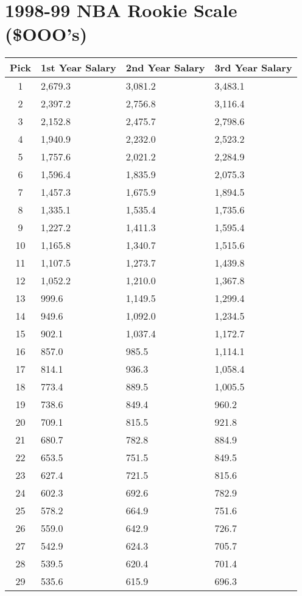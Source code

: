 \documentclass[
]{book}
\begin{document}
\newpage

\hypertarget{nba-rookie-scale-ooos}{%
\section{1998-99 NBA Rookie Scale (\$OOO's)}\label{nba-rookie-scale-ooos}}

\begin{longtable}[]{@{}clll@{}}
\toprule()
Pick & 1st Year Salary & 2nd Year Salary & 3rd Year Salary \\
\midrule()
\endhead
1 & 2,679.3 & 3,081.2 & 3,483.1 \\
2 & 2,397.2 & 2,756.8 & 3,116.4 \\
3 & 2,152.8 & 2,475.7 & 2,798.6 \\
4 & 1,940.9 & 2,232.0 & 2,523.2 \\
5 & 1,757.6 & 2,021.2 & 2,284.9 \\
6 & 1,596.4 & 1,835.9 & 2,075.3 \\
7 & 1,457.3 & 1,675.9 & 1,894.5 \\
8 & 1,335.1 & 1,535.4 & 1,735.6 \\
9 & 1,227.2 & 1,411.3 & 1,595.4 \\
10 & 1,165.8 & 1,340.7 & 1,515.6 \\
11 & 1,107.5 & 1,273.7 & 1,439.8 \\
12 & 1,052.2 & 1,210.0 & 1,367.8 \\
13 & 999.6 & 1,149.5 & 1,299.4 \\
14 & 949.6 & 1,092.0 & 1,234.5 \\
15 & 902.1 & 1,037.4 & 1,172.7 \\
16 & 857.0 & 985.5 & 1,114.1 \\
17 & 814.1 & 936.3 & 1,058.4 \\
18 & 773.4 & 889.5 & 1,005.5 \\
19 & 738.6 & 849.4 & 960.2 \\
20 & 709.1 & 815.5 & 921.8 \\
21 & 680.7 & 782.8 & 884.9 \\
22 & 653.5 & 751.5 & 849.5 \\
23 & 627.4 & 721.5 & 815.6 \\
24 & 602.3 & 692.6 & 782.9 \\
25 & 578.2 & 664.9 & 751.6 \\
26 & 559.0 & 642.9 & 726.7 \\
27 & 542.9 & 624.3 & 705.7 \\
28 & 539.5 & 620.4 & 701.4 \\
29 & 535.6 & 615.9 & 696.3 \\
\bottomrule()
\end{longtable}
\end{document}
